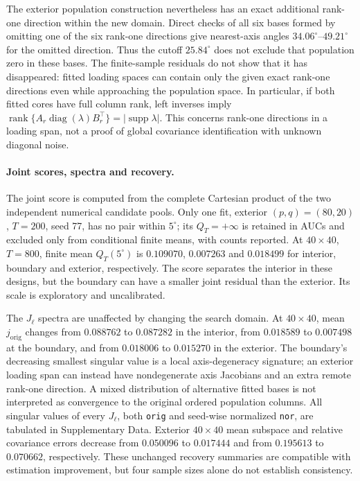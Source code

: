 \documentclass[12pt,letterpaper]{article}
\theoremstyle{plain}
\theoremstyle{definition}
\begin{document}
The exterior population construction nevertheless has an exact
additional rank-one direction within the new domain. Direct checks
of all six bases formed by omitting one of the six rank-one
directions give nearest-axis angles $34.06^\circ$--$49.21^\circ$
for the omitted direction. Thus the cutoff $25.84^\circ$ does not
exclude that population zero in these bases. The finite-sample
residuals do not show that it has disappeared: fitted loading spaces
can contain only the given exact rank-one directions even while
approaching the population space. In particular, if both fitted
cores have full column rank, left inverses imply
$\operatorname{rank}\{A_r\operatorname{diag}(\lambda)B_r^\top\}
=|\operatorname{supp}\lambda|$.
This concerns rank-one directions in a loading span, not a proof
of global covariance identification with unknown diagonal noise.

\paragraph{Joint scores, spectra and recovery.}
The joint score is computed from the complete Cartesian product
of the two independent numerical candidate pools. Only one fit,
exterior $(p,q)=(80,20)$, $T=200$, seed 77, has no pair within
$5^\circ$; its $Q_T=+\infty$ is retained in AUCs and excluded
only from conditional finite means, with counts reported.
At $40\times40$, $T=800$, finite mean $Q_T(5^\circ)$ is
$0.109070$, $0.007263$ and $0.018499$ for interior, boundary
and exterior, respectively. The score separates the interior in
these designs, but the boundary can have a smaller joint residual
than the exterior. Its scale is exploratory and uncalibrated.

The $J_\ell$ spectra are unaffected by changing the search domain.
At $40\times40$, mean $j_{\mathrm{orig}}$ changes from
$0.088762$ to $0.087282$ in the interior, from $0.018589$ to
$0.007498$ at the boundary, and from $0.018006$ to $0.015270$
in the exterior. The boundary's decreasing smallest singular value
is a local axis-degeneracy signature; an exterior loading span can
instead have nondegenerate axis Jacobians and an extra remote
rank-one direction. A mixed distribution of alternative fitted
bases is not interpreted as convergence to the original ordered
population columns. All singular values of every $J_\ell$, both
\texttt{orig} and seed-wise normalized \texttt{nor}, are tabulated
in Supplementary Data.
Exterior $40\times40$ mean subspace and relative covariance errors
decrease from $0.050096$ to $0.017444$ and from $0.195613$ to
$0.070662$, respectively. These unchanged recovery summaries are
compatible with estimation improvement, but four sample sizes
alone do not establish consistency.
\end{document}
